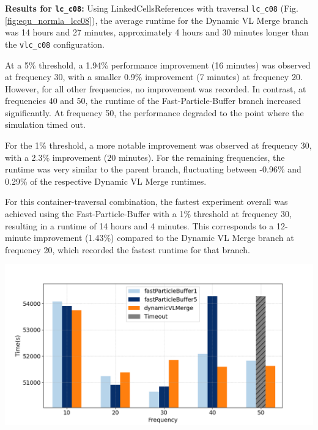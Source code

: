 \textbf{Results for \texttt{lc\_c08}:}  
Using LinkedCellsReferences with traversal \texttt{lc\_c08} (Fig.\ref{fig:equ_normla_lcc08}), the average runtime for the Dynamic VL Merge branch was 14 hours and 27 minutes, approximately 4 hours and 30 minutes longer than the \texttt{vlc\_c08} configuration.

At a 5\% threshold, a 1.94\% performance improvement (16 minutes) was observed at frequency 30, with a smaller 0.9\% improvement (7 minutes) at frequency 20. However, for all other frequencies, no improvement was recorded. In contrast, at frequencies 40 and 50, the runtime of the Fast-Particle-Buffer branch increased significantly. At frequency 50, the performance degraded to the point where the simulation timed out.


For the 1\% threshold, a more notable improvement was observed at frequency 30, with a 2.3\% improvement (20 minutes). For the remaining frequencies, the runtime was very similar to the parent branch, fluctuating between -0.96\% and 0.29\% of the respective Dynamic VL Merge runtimes.

For this container-traversal combination, the fastest experiment overall was achieved using the Fast-Particle-Buffer with a 1\% threshold at frequency 30, resulting in a runtime of 14 hours and 4 minutes. This corresponds to a 12-minute improvement (1.43\%) compared to the Dynamic VL Merge branch at frequency 20, which recorded the fastest runtime for that branch.


\begin{center}
    \includegraphics[width=0.8\linewidth]{graphs/spinodalDecomposition/lcc08.png}
    \captionsetup{hypcap=false}
    \label{fig:equ_normla_lcc08}
\end{center}
    
    



